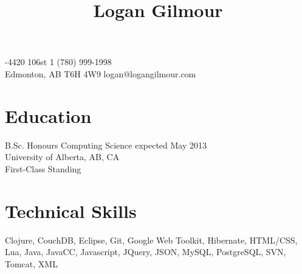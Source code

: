 \documentclass[10pt]{article}
\title{\bfseries\Large Logan Gilmour}
\author{}
\date{}
\begin{document}
\maketitle
{}-4420 106st \hfill 1 (780) 999-1998\\
Edmonton, AB  T6H 4W9 \hfill logan@logangilmour.com
\section*{Education}
B.Sc. Honours Computing Science expected May 2013\\
University of Alberta, AB, CA\\
First-Class Standing


\section*{Technical Skills}
Clojure, CouchDB, Eclipse, Git, Google Web Toolkit, Hibernate, HTML/CSS, Lua, Java, JavaCC, Javascript, JQuery, JSON, MySQL, PostgreSQL, SVN, Tomcat, XML
\end{document}
